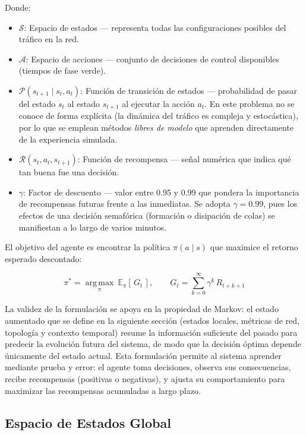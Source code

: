\documentclass[12pt,a4paper,oneside]{report}
\begin{document}
Donde:

\begin{itemize}
\item
  \(\mathcal{S}\): Espacio de estados --- representa todas las configuraciones posibles del tráfico en la red.
\item
  \(\mathcal{A}\): Espacio de acciones --- conjunto de decisiones de control disponibles (tiempos de fase verde).
\item
  \(\mathcal{P}(s_{t+1} \mid s_{t}, a_{t})\): Función de transición de estados --- probabilidad de pasar del estado \(s_{t}\) al estado \(s_{t+1}\) al ejecutar la acción \(a_{t}\). En este problema no se conoce de forma explícita (la dinámica del tráfico es compleja y estocástica), por lo que se emplean métodos \emph{libres de modelo} que aprenden directamente de la experiencia simulada.
\item
  \(\mathcal{R}(s_{t}, a_{t}, s_{t+1})\): Función de recompensa --- señal numérica que indica qué tan buena fue una decisión.
\item
  \(\gamma\): Factor de descuento --- valor entre 0.95 y 0.99 que pondera la importancia de recompensas futuras frente a las inmediatas. Se adopta \(\gamma = 0.99\), pues los efectos de una decisión semafórica (formación o disipación de colas) se manifiestan a lo largo de varios minutos.
\end{itemize}

El objetivo del agente es encontrar la política \(\pi(a \mid s)\) que maximice el retorno esperado descontado:

\begin{equation}
\pi^{*} = \operatorname*{arg\,max}_{\pi}\ \mathbb{E}_{\pi}\!\left[\, G_{t} \,\right], \qquad
G_{t} = \sum_{k = 0}^{\infty}\gamma^{k}\, R_{t + k + 1}
\label{eq:retorno}
\end{equation}

La validez de la formulación se apoya en la propiedad de Markov: el estado aumentado que se define en la siguiente sección (estados locales, métricas de red, topología y contexto temporal) resume la información suficiente del pasado para predecir la evolución futura del sistema, de modo que la decisión óptima depende únicamente del estado actual. Esta formulación permite al sistema aprender mediante prueba y error: el agente toma decisiones, observa sus consecuencias, recibe recompensas (positivas o negativas), y ajusta su comportamiento para maximizar las recompensas acumuladas a largo plazo.

\subsection{Espacio de Estados Global}\label{espacio-de-estados-global}
\end{document}
